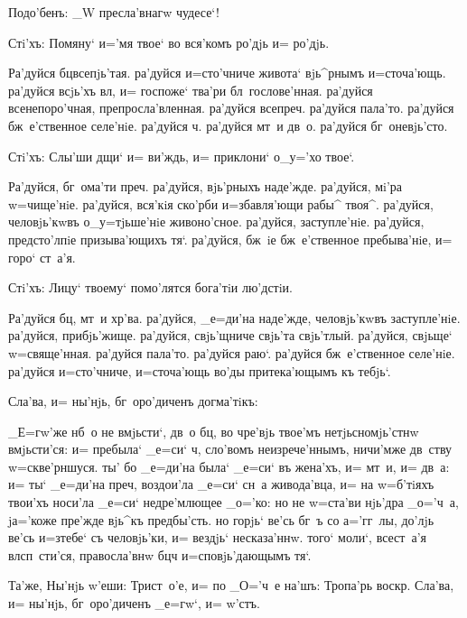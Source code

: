 Подо'бенъ: _W пресла'внагw чудесе`!

Стi'хъ: Помяну` и='мя твое` во вся'комъ ро'дjь и= 
ро'дjь.

Ра'дуйся бц всепjь'тая. ра'дуйся и=сто'чниче 
живота` вjь^рнымъ и=сточа'ющь. ра'дуйся всjь'хъ вл, 
и= госпоже` тва'ри бл~гослове'нная. ра'дуйся 
всенепоро'чная, препросла'вленная. ра'дуйся всепреч. 
ра'дуйся пала'то. ра'дуйся бж~е'ственное селе'нiе. 
ра'дуйся ч. ра'дуйся мт~и дв~о. ра'дуйся 
бг~оневjь'сто.

Стi'хъ: Слы'ши дщи` и= ви'ждь, и= приклони` о_у='хо 
твое`.

Ра'дуйся, бг~ома'ти преч. ра'дуйся, вjь'рныхъ 
наде'жде. ра'дуйся, мi'ра w=чище'нiе. ра'дуйся, вся'кiя 
ско'рби и=збавля'ющи рабы^ твоя^. ра'дуйся, человjь'кwвъ 
о_у=тjьше'нiе живоно'сное. ра'дуйся, заступле'нiе. 
ра'дуйся, предсто'лпiе призыва'ющихъ тя`. ра'дуйся, бж~iе 
бж~е'ственное пребыва'нiе, и= горо` ст~а'я.

Стi'хъ: Лицу` твоему` помо'лятся бога'тiи лю'дстiи.

Ра'дуйся бц, мт~и хр'ва. ра'дуйся, _е=ди'на 
наде'жде, человjь'кwвъ заступле'нiе. ра'дуйся, 
прибjь'жище. ра'дуйся, свjь'щниче свjь'та свjь'тлый. 
ра'дуйся, свjьще` w=свяще'нная. ра'дуйся пала'то. 
ра'дуйся раю`. ра'дуйся бж~е'ственное селе'нiе. ра'дуйся 
и=сто'чниче, и=сточа'ющь во'ды притека'ющымъ къ тебjь`.

Сла'ва, и= ны'нjь, бг~оро'диченъ догма'тiкъ:

_Е=гw'же нб~о не вмjьсти`, дв~о бц, во чре'вjь 
твое'мъ нетjьсномjь'стнw вмjьсти'ся: и= пребыла` _е=си` 
ч, сло'вомъ неизрече'ннымъ, ничи'мже дв~ству 
w=скве'рншуся. ты' бо _е=ди'на была` _е=си` въ жена'хъ, 
и= мт~и, и= дв~а: и= ты` _е=ди'на преч, воздои'ла 
_е=си` сн~а живода'вца, и= на w=б'тiяхъ твои'хъ 
носи'ла _е=си` недре'млющее _о='ко: но не w=ста'ви 
нjь'дра _о='ч~а, jа='коже пре'жде вjь^къ предбы'сть. но 
горjь` ве'сь бг~ъ со а='гг~лы, до'лjь ве'сь и=з\ъ тебе` 
съ человjь'ки, и= вездjь` несказа'ннw. того` моли`, 
всест~а'я вл сп~сти'ся, правосла'внw бц ч 
и=сповjь'дающымъ тя`.

Та'же, Ны'нjь w'еши: Трист~о'е, и= по _О='ч~е 
на'шъ: Тропа'рь воскр. Сла'ва, и= ны'нjь, 
бг~оро'диченъ _е=гw`, и= w'стъ.
